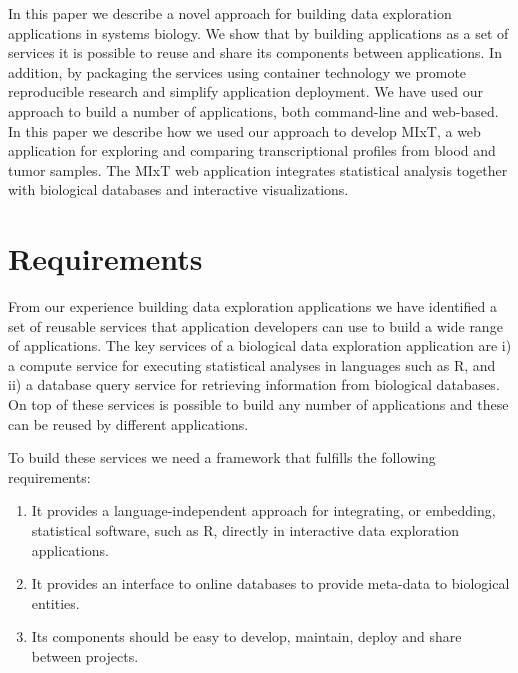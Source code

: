 

In this paper we describe a novel approach for building data exploration
applications in systems biology. We show that by building applications as a set
of services it is possible to reuse and share its components between
applications. In addition, by packaging the services using container technology
we promote reproducible research and simplify application deployment. We have
used our approach to build a number of applications, both command-line and
web-based. In this paper we describe how we used our approach to develop MIxT,
a web application for exploring and comparing transcriptional profiles from
blood and tumor samples. The MIxT web application integrates statistical
analysis together with biological databases and interactive visualizations.


\section*{Requirements} 
From our experience building data exploration applications we have identified a
set of reusable services that application developers can use to build a wide
range of applications. The key services of a biological data exploration
application are i) a compute service for executing statistical analyses in
languages such as R, and ii) a database query service for retrieving information
from biological databases.
On top of these services is possible to build any number of applications and these
can be reused by different applications. 

To build these services we need a framework that fulfills the following
requirements: 

\begin{enumerate}
    \item It provides a language-independent approach for integrating, or
        embedding, statistical software, such as R, directly in interactive data
        exploration applications.
    \item It provides an interface to online databases to provide meta-data to
        biological entities. %
    \item Its components should be easy to develop, maintain, deploy and share
        between projects. 
\end{enumerate} 


